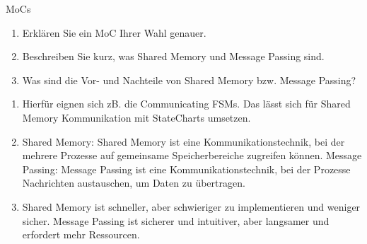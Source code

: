 \documentclass{article}
\begin{document}
\begin{exercise}{MoCs}
  \begin{enumerate}
    \item Erklären Sie ein MoC Ihrer Wahl genauer.
    \item Beschreiben Sie kurz, was Shared Memory und Message Passing sind.
    \item Was sind die Vor- und Nachteile von Shared Memory bzw. Message Passing?
  \end{enumerate}

  \begin{solution}
    \begin{enumerate}
      \item Hierfür eignen sich zB. die Communicating FSMs. Das lässt sich für Shared Memory Kommunikation mit StateCharts umsetzen.
      \item Shared Memory: Shared Memory ist eine Kommunikationstechnik, bei der mehrere Prozesse auf gemeinsame Speicherbereiche zugreifen können.
            Message Passing: Message Passing ist eine Kommunikationstechnik, bei der Prozesse Nachrichten austauschen, um Daten zu übertragen.
      \item Shared Memory ist schneller, aber schwieriger zu implementieren und weniger sicher.
            Message Passing ist sicherer und intuitiver, aber langsamer und erfordert mehr Ressourcen.
    \end{enumerate}
  \end{solution}
\end{exercise}
\end{document}
